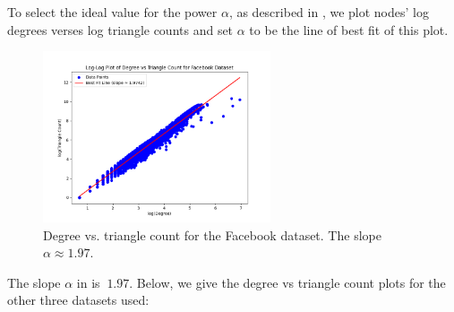 \documentclass[11pt, margin=1in]{article}
\begin{document}
To select the ideal value for the power $\alpha$, as described in , we plot nodes' log degrees verses log triangle counts and set $\alpha$ to be the line of best fit of this plot.

\begin{figure}[H]
    \centering
    \includegraphics[width=0.6\textwidth]{plots/degree-vs-triangle-count/degree_vs_triangle_count_fb.png}
    \caption{Degree vs. triangle count for the Facebook dataset. The slope $\alpha \approx 1.97$.}
    \label{fig:degree_vs_tri_fb}
\end{figure}

The slope $\alpha$  in  is $~ 1.97$.
Below, we give the degree vs triangle count plots for the other three datasets used:
\end{document}
